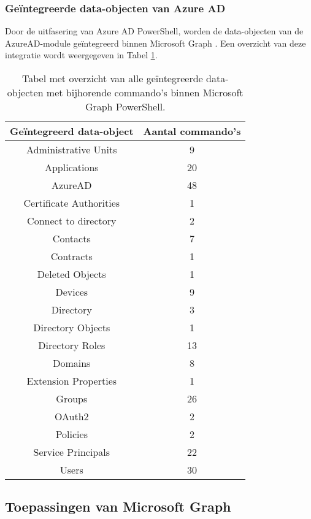 \subsubsection{Geïntegreerde data-objecten van Azure AD}

Door de uitfasering van Azure \ac{AD} PowerShell, worden de data-objecten van de AzureAD-module geïntegreerd binnen Microsoft Graph \autocite{Microsoft2023l}. Een overzicht van deze integratie wordt weergegeven in Tabel \ref{MSGDOT}.

\begin{table}
    \small
    \centering
    \begin{tabular}{ |c|c| } 
        \hline
        \textbf{Geïntegreerd data-object} & \textbf{Aantal commando's} \\
        \hline
        Administrative Units & 9 \\ 
        Applications & 20 \\ 
        AzureAD & 48 \\ 
        Certificate Authorities & 1 \\ 
        Connect to directory & 2 \\ 
        Contacts & 7 \\ 
        Contracts & 1 \\ 
        Deleted Objects & 1 \\ 
        Devices & 9 \\    
        Directory & 3 \\
        Directory Objects & 1 \\ 
        Directory Roles & 13 \\ 
        Domains & 8 \\ 
        Extension Properties & 1 \\ 
        Groups & 26 \\ 
        OAuth2 & 2 \\ 
        Policies & 2 \\ 
        Service Principals & 22 \\ 
        Users & 30 \\ 
        \hline
    \end{tabular}
    \caption[Tabel geïntegreerde data-objecten]{Tabel met overzicht van alle geïntegreerde data-objecten met bijhorende commando's binnen Microsoft Graph PowerShell.}
    \label{MSGDOT}
\end{table}

\subsection{Toepassingen van Microsoft Graph}

